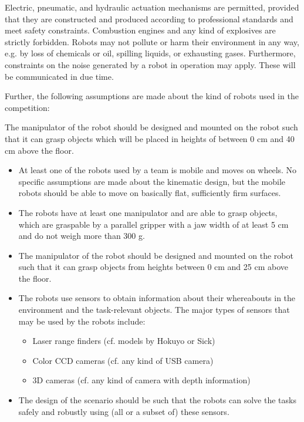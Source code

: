 Electric, pneumatic, and hydraulic actuation mechanisms are permitted, provided that they are constructed and produced according to professional standards and meet safety constraints. Combustion engines and any kind of explosives are strictly forbidden. Robots may not pollute or harm their environment in any way, e.g. by loss of chemicals or oil, spilling liquids, or exhausting gases. Furthermore, constraints on the noise generated by a robot in operation may apply. These will be communicated in due time.
\par
Further, the following assumptions are made about the kind of robots used in the competition:



The manipulator of the robot should be designed and mounted on the robot such that it can grasp objects which will be placed in heights of between 0 cm and 40 cm above the floor.
\par
\begin{itemize}

	\item At least one of the robots used by a team is mobile and moves on wheels. No specific assumptions are made about the kinematic design, but the mobile robots should be able to move on basically flat, sufficiently firm surfaces.
	\item The robots have at least one manipulator and are able to grasp objects, which are graspable by a parallel gripper with a jaw width of at least 5 cm and do not weigh more than 300 g.
	\item The manipulator of the robot should be designed and mounted on the robot such that it can grasp objects from heights between 0 cm and 25 cm above the floor.
	\item The robots use sensors to obtain information about their whereabouts in the environment and the task-relevant objects. The major types of sensors that may be used by the robots include:
	\begin{itemize}
		\item Laser range finders (cf. models by Hokuyo or Sick)
		\item Color CCD cameras (cf. any kind of USB camera)
		\item 3D cameras (cf. any kind of camera with depth information)
	\end{itemize}
	\item The design of the scenario should be such that the robots can solve the tasks safely and robustly using (all or a subset of) these sensors.

\end{itemize}



